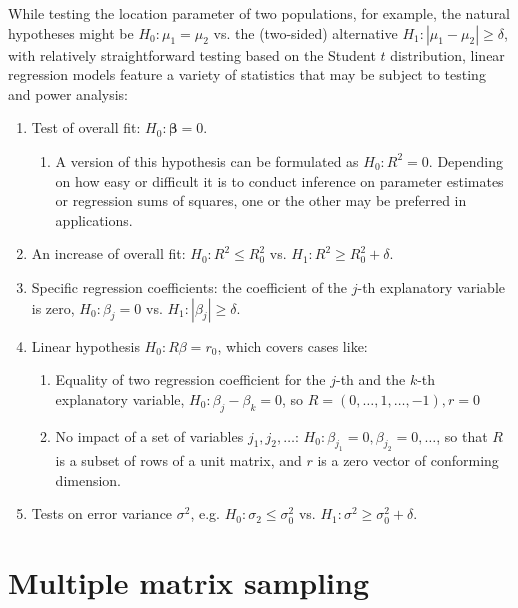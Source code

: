 \documentclass[11pt]{asaproc}
\begin{document}
While testing the location parameter of two populations, for example, the natural hypotheses
might be $H_0: \mu_1 = \mu_2$ vs. the (two-sided) alternative $H_1: |\mu_1 - \mu_2| \ge \delta$,
with relatively straightforward testing based on the Student $t$ distribution, linear regression
models feature a variety of statistics that may be subject to testing and power analysis:
\begin{enumerate}
    \item Test of overall fit: $H_0: \mathbf{\beta}=0$.
    \begin{enumerate}
        \item A version of this hypothesis can be formulated as $H_0: R^2=0$. Depending
            on how easy or difficult it is to conduct inference on parameter estimates
            or regression sums of squares, one or the other may be preferred in applications.
    \end{enumerate}
    \item An increase of overall fit: $H_0: R^2 \le R_0^2$ vs. $H_1: R^2 \ge R_0^2 + \delta$.
    \item Specific regression coefficients: the coefficient of the $j$-th explanatory variable
        is zero, $H_0: \beta_j = 0$ vs. $H_1: | \beta_j | \ge \delta$.
    \item Linear hypothesis $H_0: R\beta = r_0$, which covers cases like:
    \begin{enumerate}
        \item Equality of two regression coefficient for the $j$-th and the $k$-th explanatory variable,
        $H_0: \beta_j - \beta_k = 0$, so $R = (0, \ldots, 1, \ldots, -1), r=0$
        \item No impact of a set of variables $j_1, j_2, \ldots$: $H_0: \beta_{j_1}=0, \beta_{j_2}=0, \ldots$,
        so that $R$ is a subset of rows of a unit matrix, and $r$ is a zero vector of conforming dimension.
    \end{enumerate}
    \item Tests on error variance $\sigma^2$, e.g. $H_0: \sigma_2 \le \sigma^2_0$ vs. $H_1: \sigma^2 \ge \sigma_0^2 + \delta$.
\end{enumerate}

\section{Multiple matrix sampling}
\end{document}
